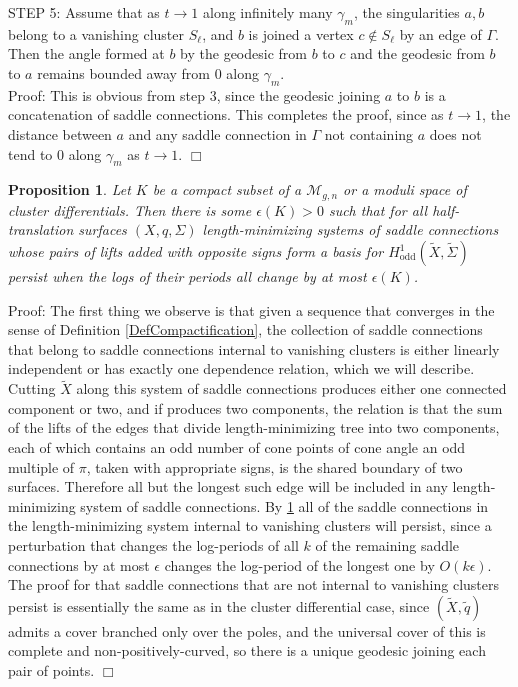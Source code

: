 \documentclass[12pt]{article}
\newtheorem{proposition}[theorem]{Proposition}
\begin{document}
\noindent STEP 5: Assume that as $t \to 1$ along infinitely many $\gamma_m$, the singularities $a,b$ belong to a vanishing cluster $S_\ell$, and $b$ is joined a vertex $c \notin S_\ell$ by an edge of $\Gamma$. Then the angle formed at $b$ by the geodesic from $b$ to $c$ and the geodesic from $b$ to $a$ remains bounded away from $0$ along $\gamma_m$.\\

\noindent Proof: This is obvious from step $3$, since the geodesic joining $a$ to $b$ is a concatenation of saddle connections. This completes the proof, since as $t \to 1$, the distance between $a$ and any saddle connection in $\Gamma$ not containing $a$ does not tend to $0$ along $\gamma_m$ as $t \to 1$. $\Box$

\begin{proposition}\label{PropMultStable} Let $K$ be a compact subset of a $\mathcal{M}_{g,n}$ or a moduli space of cluster differentials. Then there is some $\epsilon(K) > 0$ such that for all half-translation surfaces $(X,q,\Sigma)$ length-minimizing systems of saddle connections whose pairs of lifts added with opposite signs form a basis for $H_{\mathrm{odd}}^1(\tilde{X},\tilde{\Sigma})$ persist when the logs of their periods all change by at most $\epsilon(K)$.\end{proposition}

\noindent Proof: The first thing we observe is that given a sequence that converges in the sense of Definition \ref{DefCompactification}, the collection of saddle connections that belong to saddle connections internal to vanishing clusters is either linearly independent or has exactly one dependence relation, which we will describe. Cutting $\tilde{X}$ along this system of saddle connections produces either one connected component or two, and if produces two components, the relation is that the sum of the lifts of the edges that divide length-minimizing tree into two components, each of which contains an odd number of cone points of cone angle an odd multiple of $\pi$, taken with appropriate signs, is the shared boundary of two surfaces. Therefore all but the longest such edge will be included in any length-minimizing system of saddle connections. By \ref{PropMultStable} all of the saddle connections in the length-minimizing system internal to vanishing clusters will persist, since a perturbation that changes the log-periods of all $k$ of the remaining saddle connections by at most $\epsilon$ changes the log-period of the longest one by $O(k\epsilon)$. The proof for that saddle connections that are not internal to vanishing clusters persist is essentially the same as in the cluster differential case, since $(\tilde{X},\tilde{q})$ admits a cover branched only over the poles, and the universal cover of this is complete and non-positively-curved, so there is a unique geodesic joining each pair of points. $\Box$\\
\end{document}
